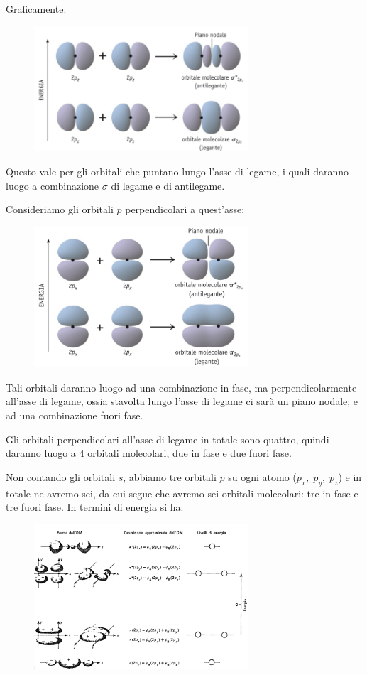 Graficamente:

\begin{figure}[htp]
    \centering
    \includegraphics[width=8cm]{immagini/orbitali_sigma_p.png}
\end{figure}

Questo vale per gli orbitali che puntano lungo l'asse di legame, i quali daranno luogo a combinazione $\sigma$ di legame e di antilegame.

Consideriamo gli orbitali $p$ perpendicolari a quest'asse:

\begin{figure}[htp]
    \centering
    \includegraphics[width=8cm]{immagini/orbitale_pigreco_p.png}
\end{figure}
Tali orbitali daranno luogo ad una combinazione in fase, ma perpendicolarmente all'asse di legame, ossia stavolta lungo l'asse di legame ci sarà un piano nodale; e ad una combinazione fuori fase.

Gli orbitali perpendicolari all'asse di legame in totale sono quattro, quindi daranno luogo a 4 orbitali molecolari, due in fase e due fuori fase.

Non contando gli orbitali $s$, abbiamo tre orbitali $p$ su ogni atomo ($p_x, \; p_y, \; p_z$) e in totale ne avremo sei, da cui segue che avremo sei orbitali molecolari: tre in fase e tre fuori fase.
In termini di energia si ha:

\begin{figure}[htp]
    \centering
    \includegraphics[width=8cm]{immagini/equazioni_orbitali.png}
\end{figure}

